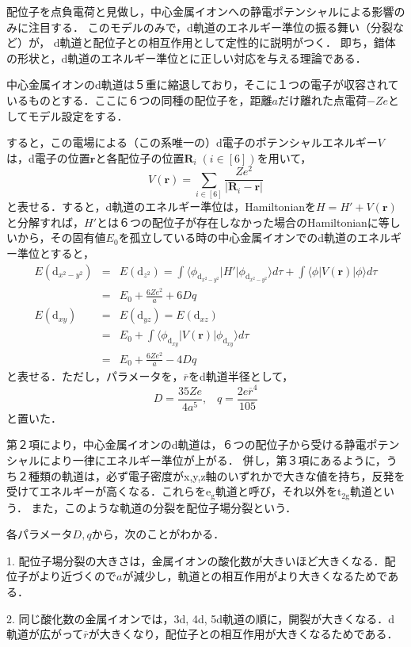 \documentclass[uplatex, dvipdfmx]{jsreport}
\begin{document}
\begin{model}
    配位子を点負電荷と見做し，中心金属イオンへの静電ポテンシャルによる影響のみに注目する．
    このモデルのみで，d軌道のエネルギー準位の振る舞い（分裂など）が，
    d軌道と配位子との相互作用として定性的に説明がつく．
    即ち，錯体の形状と，d軌道のエネルギー準位とに正しい対応を与える理論である．
\end{model}
\begin{example}[６配位，正八面体]
    中心金属イオンのd軌道は５重に縮退しており，そこに１つの電子が収容されているものとする．ここに６つの同種の配位子を，距離$a$だけ離れた点電荷$-Ze$としてモデル設定をする．

    すると，この電場による（この系唯一の）d電子のポテンシャルエネルギー$V$は，d電子の位置$\mathbf{r}$と各配位子の位置$\mathbf{R}_i\;(i\in [6])$を用いて，
    \[ V(\mathbf{r})=\sum_{i\in [6]}\frac{Ze^2}{|\mathbf{R}_i-\mathbf{r}|} \]
    と表せる．すると，d軌道のエネルギー準位は，Hamiltonianを$H=H'+V(\mathbf{r})$と分解すれば，$H'$とは６つの配位子が存在しなかった場合のHamiltonianに等しいから，その固有値$E_0$を孤立している時の中心金属イオンでのd軌道のエネルギー準位とすると，
    \begin{eqnarray*}
        E(\mathrm{d}_{x^2-y^2}) &=& E(\mathrm{d}_{z^2}) = \int \langle\phi_{\mathrm{d}_{x^2-y^2}} |H'|\phi_{\mathrm{d}_{x^2-y^2}}\rangle d\tau +  \int \langle\phi |V(\mathbf{r})|\phi\rangle d\tau \\
        &=& E_0 + \frac{6Ze^2}{a}+6Dq\\
        E(\mathrm{d}_{xy}) &=& E(\mathrm{d}_{yz})=E(\mathrm{d}_{xz}) \\
        &=& E_0+  \int \langle\phi_{\mathrm{d}_{xy}} |V(\mathbf{r})|\phi_{\mathrm{d}_{xy}}\rangle d\tau \\
        &=& E_0 + \frac{6Ze^2}{a}-4Dq
    \end{eqnarray*}
    と表せる．ただし，パラメータを，$\overline{r}$をd軌道半径として，
    \[ D=\frac{35Ze}{4a^5},\;\;\; q=\frac{2e\overline{r}^4}{105} \]
    と置いた．
    
    第２項により，中心金属イオンのd軌道は，６つの配位子から受ける静電ポテンシャルにより一律にエネルギー準位が上がる．
    併し，第３項にあるように，うち２種類の軌道は，必ず電子密度がx,y,z軸のいずれかで大きな値を持ち，反発を受けてエネルギーが高くなる．これらを$\mathrm{e_g}$軌道と呼び，それ以外を$\mathrm{t_{2g}}$軌道という．
    また，このような軌道の分裂を配位子場分裂という．

    各パラメータ$D,q$から，次のことがわかる．

    1. 配位子場分裂の大きさは，金属イオンの酸化数が大きいほど大きくなる．配位子がより近づくので$a$が減少し，軌道との相互作用がより大きくなるためである．

    2. 同じ酸化数の金属イオンでは，3d, 4d, 5d軌道の順に，開裂が大きくなる．d軌道が広がって$\overline{r}$が大きくなり，配位子との相互作用が大きくなるためである．
\end{example}
\end{document}
